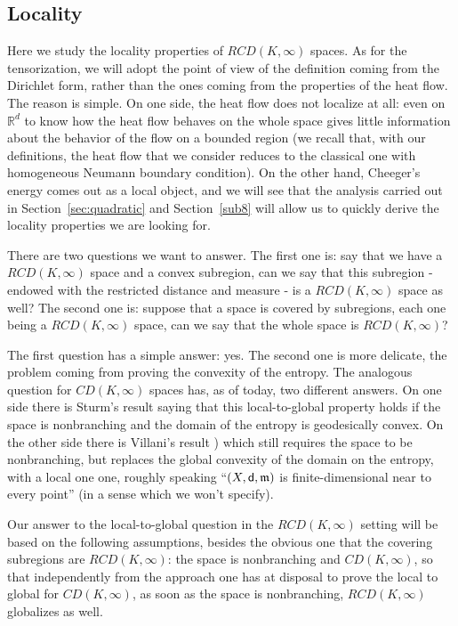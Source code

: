\documentclass[reqno,11pt]{article}
\numberwithin{equation}{section}
\newcommand{\R}{\mathbb{R}}
\newcommand{\mm}{{\mbox{\boldmath$m$}}}
\newcommand{\sfd}{{\sf d}}
\newcommand{\rcd}[2]{RCD(#1,#2)}
\renewcommand{\mm}{\mathfrak m}
\begin{document}
\subsection{Locality}

Here we study the locality properties of $\rcd K\infty$ spaces. As
for the tensorization, we will adopt the point of view of the
definition coming from the Dirichlet form, rather than the ones
coming from the properties of the heat flow. The reason is simple.
On one side, the heat flow does not localize at all: even on $\R^d$
to know how the heat flow behaves on the whole space gives little
information about the behavior of the flow on a bounded region (we
recall that, with our definitions, the heat flow that we consider
reduces to the classical one with homogeneous Neumann boundary
condition). On the other hand, Cheeger's energy comes out as a local
object, and we will see that the analysis carried out in
Section~\ref{sec:quadratic} and Section~\ref{sub8} will allow us to
quickly derive the locality properties we are looking for.

There are two questions we want to answer. The first one is: say
that we have a $\rcd K\infty$ space and a convex subregion, can we
say that this subregion - endowed with the restricted distance and
measure - is a $\rcd K\infty$ space as well? The second one is:
suppose that a space is covered by subregions, each one being a
$\rcd K\infty$ space, can we say that the whole space is $\rcd
K\infty$?

The first question has a simple answer: yes. The second one is more
delicate, the problem coming from proving the convexity of the
entropy. The analogous question for $CD(K,\infty)$ spaces has, as of
today, two different answers. On one side there is Sturm's result
\cite[Theorem~4.17]{Sturm06I} saying that this local-to-global
property holds if the space is nonbranching and the domain of the
entropy is geodesically convex. On the other side there is Villani's
result \cite[Theorem~30.42]{Villani09}) which still requires the
space to be nonbranching, but replaces the global convexity of the
domain on the entropy, with a local one one, roughly speaking
``$(X,\sfd,\mm)$ is finite-dimensional near to every point'' (in a
sense which we won't specify).

Our answer to the local-to-global question in the $\rcd K\infty$
setting will be based on the following assumptions, besides the
obvious one that the covering subregions are $\rcd K\infty$: the
space is nonbranching and $CD(K,\infty)$, so that independently from
the approach one has at disposal to prove the local to global for
$CD(K,\infty)$, as soon as the space is nonbranching, $\rcd K\infty$
globalizes as well.
\end{document}
